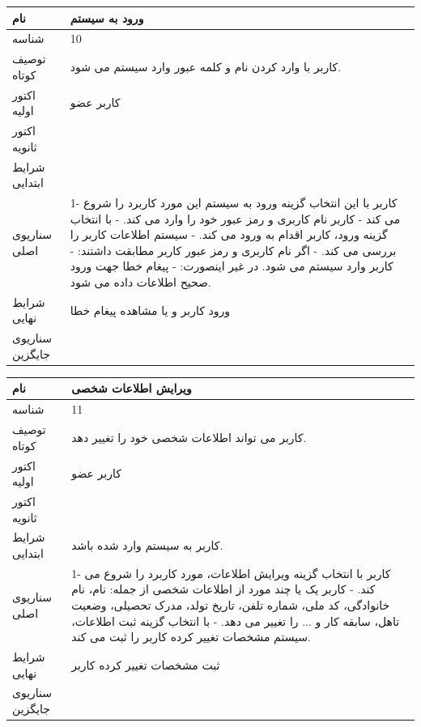 \begin{tabular}{|p{2cm}|p{10cm}|}
\hline
نام
&
ورود به سیستم
\\
\hline
شناسه
&
10
\\
\hline
توصیف کوتاه
&
کاربر با وارد کردن نام و کلمه عبور وارد سیستم می شود.
\\
\hline
اکتور اولیه
&
کاربر عضو
\\
\hline
اکتور ثانویه
&

\\
\hline
شرایط ابتدایی
&

\\
\hline
سناریوی اصلی
&
1- کاربر با این انتخاب گزینه ورود به سیستم این مورد کاربرد را شروع می کند
\newline
2- کاربر نام کاربری و رمز عبور خود را وارد می کند.
\newline
3- با انتخاب گزینه ورود، کاربر اقدام به ورود می کند.
\newline
4- سیستم اطلاعات کاربر را بررسی می کند.
\newline
5- اگر نام کاربری و رمز عبور کاربر مطابقت داشتند:
\newline
5.1- کاربر وارد سیستم می شود.
\newline
در غیر اینصورت:
\newline
5.2- پیغام خطا جهت ورود صحیح اطلاعات داده می شود.
\\
\hline
شرایط نهایی
&
ورود کاربر و یا مشاهده پیغام خطا
\\
\hline
سناریوی جایگزین
&

\\
\hline
\end{tabular}

\vspace{2cm}


\begin{tabular}{|p{2cm}|p{10cm}|}
\hline
نام
&
ویرایش اطلاعات شخصی
\\
\hline
شناسه
&
11
\\
\hline
توصیف کوتاه
&
کاربر می تواند اطلاعات شخصی خود را تغییر دهد.
\\
\hline
اکتور اولیه
&
کاربر عضو
\\
\hline
اکتور ثانویه
&

\\
\hline
شرایط ابتدایی
&
کاربر به سیستم وارد شده باشد.
\\
\hline
سناریوی اصلی
&
1- کاربر با انتخاب گزینه ویرایش اطلاعات، مورد کاربرد را شروع می کند.
\newline
2- کاربر یک یا چند مورد از اطلاعات شخصی از جمله: نام، نام خانوادگی، کد ملی، شماره تلفن، تاریخ تولد، مدرک تحصیلی، وضعیت تاهل، سابقه کار و ... را تغییر می دهد.
\newline
3- با انتخاب گزینه ثبت اطلاعات، سیستم مشخصات تغییر کرده کاربر را ثبت می کند. 
\\
\hline
شرایط نهایی
&
ثبت مشخصات تغییر کرده کاربر
\\
\hline
سناریوی جایگزین
&

\\
\hline
\end{tabular}

